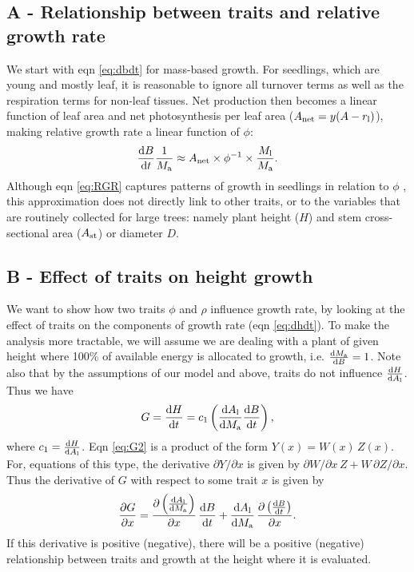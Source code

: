 \documentclass[a4paper,11pt]{article}
\begin{document}
\subsection{A - Relationship between traits and relative growth rate} \label{app:traits-RGR}

We start with eqn \ref{eq:dbdt} for mass-based growth. For seedlings, which are
young and mostly leaf, it is reasonable to ignore all turnover terms as
well as the respiration terms for non-leaf tissues. Net production then
becomes a linear function of leaf area and net photosynthesis per leaf
area ($A_\textrm{net} = y(A - r_{\rm l})$), making relative growth
rate a linear function of $\phi$:
\begin{equation}\label{eq:RGR}
\frac{{\rm d}B}{{\rm d}t}\frac{1}{M_{\rm a}}  \approx A_\textrm{net} \times \phi^{-1} \times \frac{M_{\rm l}}{M_{\rm a}}. \end{equation}
Although eqn \ref{eq:RGR} captures patterns of growth in seedlings in
relation to $\phi$ \citep{Wright-2000}, this
approximation does not directly link to other traits, or to the
variables that are routinely collected for large trees: namely plant
height ($H$) and stem cross-sectional area ($A_{\rm st}$) or
diameter $D$.

\subsection{B - Effect of traits on height growth} \label{app:traits-RGR}

We want to show how two traits $\phi$ and $\rho$ influence growth rate,
by looking at the effect of
traits on the components of growth rate (eqn \ref{eq:dhdt}). To make
the analysis more tractable, we will assume we are dealing with a plant of
given height where 100\% of available energy is allocated to growth,
i.e. $\frac{{\rm d}M_{\rm a}}{{\rm d}B}=1$. Note also
that by the assumptions of our model and above, traits do not influence
$\frac{{\rm d}H} {{\rm d}A_{\rm l}}$. Thus we have
\begin{equation} \label{eq:G2}
G = \frac{{\rm d}H}{{\rm d}t} = c_1   \left(\frac{{\rm d}A_{\rm l}} {{\rm d}M_{\rm a}}  \frac{ {\rm d}B} {{\rm d}t} \right),
\end{equation}
where $c_1 = \frac{{\rm d}H}{{\rm d}A_{\rm l}}$. Eqn
\ref{eq:G2} is a product of the form $Y(x) = W(x) \, Z(x)$. For,
equations of this type, the derivative $\partial{Y}/\partial{x}$ is
given by $\partial{W}/\partial{x} \, Z + W \, \partial{Z}/\partial{x}$. Thus
the derivative of $G$ with respect to some trait $x$  is given by
\begin{equation} \label{eq:dG}
\frac{\partial G} {\partial x} =
\frac{\partial \left(\frac{{\rm d}A_{\rm l}} {{\rm d}M_{\rm a}}\right)}{\partial x}
 \, \frac{ {\rm d}B} {{\rm d}t}
+ \frac{{\rm d}A_{\rm l}} {{\rm d}M_{\rm a}}
\, \frac{\partial \left( \frac{ {\rm d}B} {{\rm d}t}\right)}{\partial x}.
\end{equation}
If this derivative is positive (negative), there will be a positive (negative) relationship
between traits and growth at the height where it is evaluated.
\end{document}
